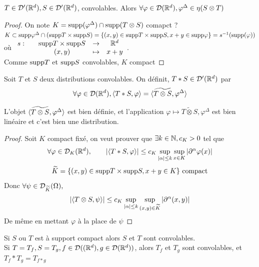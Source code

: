 \documentclass[]{report}
\begin{document}
    \begin{prop}{}{}
        $T\in \mathcal{D}'(\mathbb{R}^d),S\in \mathcal{D}'(\mathbb{R}^d)$, convolables. Alors $\forall \varphi\in \mathcal{D}(\mathbb{R}^d),\varphi^{\Delta}\in \eta(S\otimes T)$
    \end{prop}

    \begin{proof}
        On note $K=\text{supp}(\varphi^{\Delta})\cap \text{supp}(T\otimes S)$ comapct ?
        $K\subset \text{supp}\varphi^\Delta\cap (\text{supp} T\times \text{supp} S)=\{(x,y)\in \text{supp} T\times \text{supp} S, x+y\in \text{supp} \varphi\}=s^{-1}(\text{supp}(\varphi))$ où $\begin{array}{ccccc} s : & & \text{supp} T\times \text{supp} S & \to & \mathbb{R}^d \\ & & (x,y) & \mapsto & x+y \end{array}$.\\
        Comme $\text{supp} T$ et $\text{supp} S$ convolables, $K$ compact
    \end{proof}

    \begin{df}{}{}
        Soit $T$ et $S$ deux distributions convolables. On définit, $T*S\in \mathcal{D}'(\mathbb{R}^d)$ par
        \[\forall \varphi\in \mathcal{D}(\mathbb{R}^d),\langle T*S,\varphi \rangle=\langle \widetilde{T\otimes S},\varphi^\Delta \rangle\]
    \end{df}
    
    L'objet $\langle \widetilde{T\otimes S},\varphi^\Delta \rangle$ est bien définie, et l'application $\varphi\mapsto \widetilde{T\otimes S},\varphi^\Delta$ est bien linéaire et c'est bien une distribution.\\
    
    \begin{proof}
        Soit $K$ compact fixé, on veut prouver que $\exists k\in \mathbb{N},c_K>0$ tel que
        \[\forall \varphi\in \mathcal{D}_K(\mathbb{R}^d),\qquad |\langle T*S,\varphi \rangle|\le c_K\sup_{|\alpha|\le k}\sup_{x\in K}|\partial^\alpha \varphi(x)|\]
        \[\widetilde{K}=\{(x,y)\in \text{supp} T\times \text{supp} S,x+y\in K\}\text{ compact}\]
        Donc $\forall \psi\in \mathcal{D}_{\widetilde{K}}(\Omega),$
        \begin{align*}
            |\langle T\otimes S,\psi \rangle|\le c_K \sup_{|\alpha|\le k}\sup_{(x,y)\in \widetilde{K}}|\partial^\alpha(x,y)|
        \end{align*}
        De même en mettant $\varphi$ à la place de $\psi$
    \end{proof}

    \begin{re}{}{}
        Si $S$ ou $T$ est à support compact alors $S$ et $T$ sont convolables.\\
        Si $T=T_f,S=T_g,f\in \mathcal{D}((\mathbb{R}^d),g\in \mathcal{D}(\mathbb{R}^d))$, alors $T_f$ et $T_g$ sont convolables, et $T_f*T_g=T_{f*g}$
    \end{re}
\end{document}
